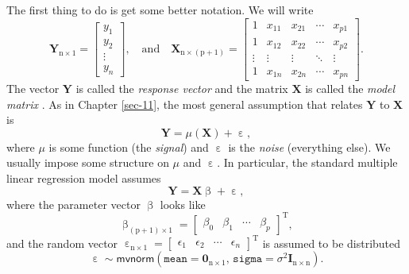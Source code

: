 \documentclass[captions=tableheading]{scrbook}
\begin{document}
The first thing to do is get some better notation. We will write 
\begin{equation}
\mathbf{Y}_{\mathrm{n}\times1}=
\begin{bmatrix}y_{1}\\
y_{2}\\
\vdots\\
y_{n}
\end{bmatrix},
\quad\mbox{and}\quad\mathbf{X}_{\mathrm{n}\times(\mathrm{p}+1)}=
\begin{bmatrix}1 & x_{11} & x_{21} & \cdots & x_{p1}\\
1 & x_{12} & x_{22} & \cdots & x_{p2}\\
\vdots & \vdots & \vdots & \ddots & \vdots\\
1 & x_{1n} & x_{2n} & \cdots & x_{pn}
\end{bmatrix}.
\end{equation}
The vector \(\mathbf{Y}\) is called the \emph{response vector}  and the matrix \(\mathbf{X}\) is called the \emph{model matrix} . As in Chapter \ref{sec-11}, the most general assumption that relates \(\mathbf{Y}\) to \(\mathbf{X}\) is
\begin{equation}
\mathbf{Y}=\mu(\mathbf{X})+\upepsilon,
\end{equation}
where \(\mu\) is some function (the \emph{signal}) and \(\upepsilon\) is the \emph{noise} (everything else). We usually impose some structure on \(\mu\) and \(\upepsilon\). In particular, the standard multiple linear regression model assumes
\begin{equation}
\mathbf{Y}=\mathbf{X}\upbeta+\upepsilon,
\end{equation}
where the parameter vector \(\upbeta\) looks like 
\begin{equation}
\upbeta_{(\mathrm{p}+1)\times1}=\begin{bmatrix}\beta_{0} & \beta_{1} & \cdots & \beta_{p}\end{bmatrix}^{\mathrm{T}},
\end{equation}
and the random vector \(\upepsilon_{\mathrm{n}\times1}=\begin{bmatrix}\epsilon_{1} & \epsilon_{2} & \cdots & \epsilon_{n}\end{bmatrix}^{\mathrm{T}}\) is assumed to be distributed
\begin{equation}
\upepsilon\sim\mathsf{mvnorm}\left(\mathtt{mean}=\mathbf{0}_{\mathrm{n}\times1},\,\mathtt{sigma}=\sigma^{2}\mathbf{I}_{\mathrm{n}\times\mathrm{n}}\right).
\end{equation}
\end{document}
